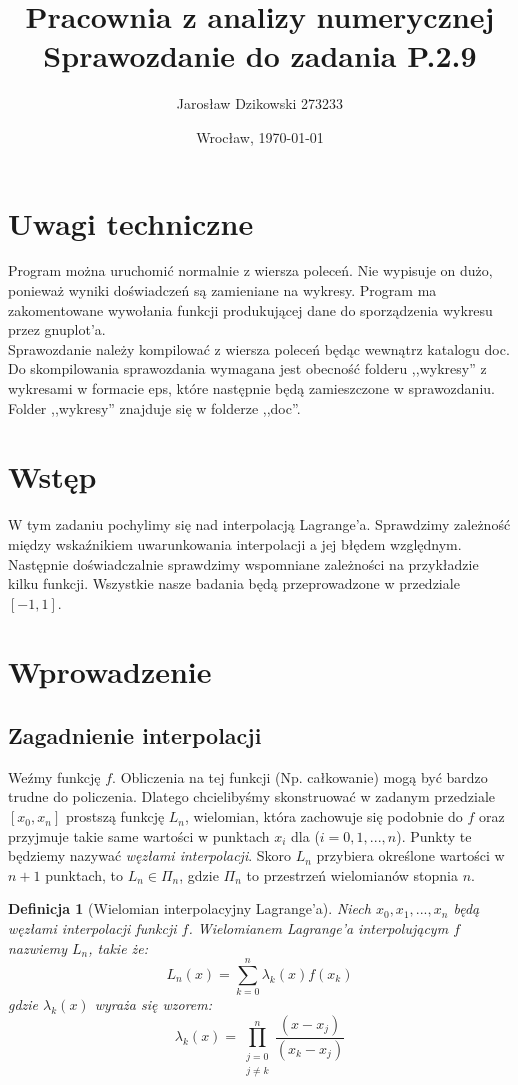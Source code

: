 \documentclass{article}
\author{Jarosław Dzikowski 273233}
\date{Wrocław, \today}
\title{\textbf{Pracownia z analizy numerycznej} \\ Sprawozdanie do zadania \textbf{P.2.9}}
\newtheorem{defi}{Definicja}
\begin{document}
\maketitle
\section{Uwagi techniczne}
Program można uruchomić normalnie z wiersza poleceń. Nie wypisuje on dużo, ponieważ wyniki doświadczeń są zamieniane na wykresy. Program ma zakomentowane wywołania funkcji produkującej dane do sporządzenia wykresu przez gnuplot'a.\\

Sprawozdanie należy kompilować z wiersza poleceń będąc wewnątrz katalogu doc.
Do skompilowania sprawozdania wymagana jest obecność folderu ,,wykresy'' z wykresami w formacie eps, które następnie będą zamieszczone w sprawozdaniu. Folder ,,wykresy'' znajduje się w folderze ,,doc''.

\section{Wstęp}
W tym zadaniu pochylimy się nad interpolacją Lagrange'a. Sprawdzimy zależność między wskaźnikiem uwarunkowania interpolacji a jej błędem względnym. Następnie doświadczalnie sprawdzimy wspomniane zależności na przykładzie kilku funkcji.
Wszystkie nasze badania będą przeprowadzone w przedziale $[-1, 1]$.

\section{Wprowadzenie}

\subsection{Zagadnienie interpolacji}
Weźmy funkcję $f$. Obliczenia na tej funkcji (Np. całkowanie) mogą być bardzo trudne do policzenia. Dlatego chcielibyśmy skonstruować w zadanym przedziale $[x_0, x_n]$ prostszą funkcję $L_n$, wielomian, która zachowuje się podobnie do $f$ oraz przyjmuje takie same wartości w punktach $x_i$ dla ($i = 0, 1, ... , n$). Punkty te będziemy nazywać \emph{węzłami interpolacji}. Skoro $L_n$ przybiera określone wartości w $n+1$ punktach, to $L_n \in \Pi_n$, gdzie $\Pi_n$ to przestrzeń wielomianów stopnia $n$.

\begin{defi}[Wielomian interpolacyjny Lagrange'a]

Niech $x_0, x_1, ... , x_n$ będą węzłami interpolacji funkcji $f$. Wielomianem Lagrange'a interpolującym $f$ nazwiemy $L_n$, takie że:
\begin{equation}
L_n(x) = \sum_{k = 0}^n \lambda_k(x) f(x_k)
\end{equation}
gdzie $\lambda_k(x)$ wyraża się wzorem:
\begin{equation}
\lambda_k(x) = \prod_{\substack{j = 0 \\ j \neq k}}^n \frac{(x - x_j)}{(x_k - x_j)}
\end{equation}

\end{defi}
\end{document}
